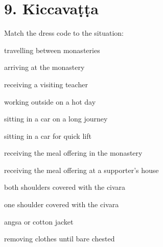 \chapter{9. Kiccavaṭṭa}
\renewcommand*{\theChapterTitle}{9. Kiccavaṭṭa}

\begin{exam}{\autoExamName}

\begin{problem*}

  Match the dress code to the situation:

  \bigskip

  \begin{multicols}{2}

    \begin{parts}

    \item \fillin{2cm}{\ref{both}} travelling between monasteries
    \item \fillin{2cm}{\ref{one}} arriving at the monastery
    \item \fillin{2cm}{\ref{one}} receiving a visiting teacher
    \item \fillin{2cm}{\ref{angsa}} working outside on a hot day
    \item \fillin{2cm}{\ref{both}} sitting in a car on a long journey
    \item \fillin{2cm}{\ref{both}} sitting in a car for quick lift
    \item \fillin{2cm}{\ref{one}} receiving the meal offering in the monastery
    \item \fillin{2cm}{\ref{both}} receiving the meal offering at a supporter's house

    \columnbreak

    \bMatchChoices

    \item\label{both} both shoulders covered with the civara
    \item\label{one} one shoulder covered with the civara
    \item\label{angsa} angsa or cotton jacket
    \item\label{bare} removing clothes until bare chested

    \eMatchChoices

    \end{parts}
  
  \end{multicols}

\end{problem*}


\end{exam}
